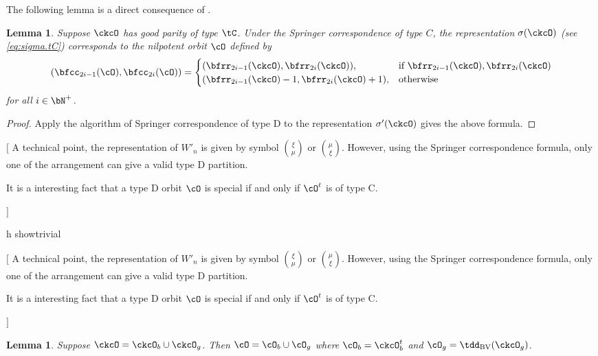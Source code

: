 \documentclass[12pt,a4paper]{amsart}
\newcommand{\trivial}[2][]{\if\relax\detokenize{#1}\relax
  {%
      \color{orange} \vspace{0em} $[$  #2 $]$
      \color{black}
  }
  \else
\ifx#1h
\ifcsname showtrivial\endcsname
{%
    \color{orange} \vspace{0em}  $[$ #2 $]$
    \color{black}
}
\fi
\else {\red Wrong argument!} \fi
\fi
}
\numberwithin{equation}{section}
\newtheorem{lem}[thm]{Lemma}
\theoremstyle{remark}
\begin{document}
The following lemma is a direct consequence of .
\begin{lem}
  Suppose $\ckcO$ has good parity of type $\tC$. Under the Springer
  correspondence of type $C$, the representation $\sigma(\ckcO)$ (see
  \eqref{eq:sigma.tC}) corresponds to the nilpotent orbit $\cO$ defined by
  \[
    (\bfcc_{2i-1}(\cO),\bfcc_{2i}(\cO)) =\begin{cases}
      (\bfrr_{2i-1}(\ckcO),\bfrr_{2i}(\ckcO)), & \text{if } \bfrr_{2i-1}(\ckcO),\bfrr_{2i}(\ckcO)\\
      (\bfrr_{2i-1}(\ckcO)-1,\bfrr_{2i}(\ckcO)+1), & \text{otherwise} \\
    \end{cases}
  \]
  for all $i\in \bN^+$.
\end{lem}
\begin{proof}
  Apply the algorithm of Springer correspondence of type D to the representation $\sigma'(\ckcO)$ gives the above formula.
\end{proof}
\trivial{
A technical point, the representation of $W'_n$ is given by symbol $\binom{\xi}{\mu}$ or
$\binom{\mu}{\xi}$. However, using the Springer correspondence formula, only one of the arrangement
can give a valid type D partition.

It is a interesting fact that a type D orbit $\cO$ is special if and only if $\cO^t$ is of type C.



}



\def\tdBV{\tdd_{\text{BV}}}
\begin{lem}
Suppose $\ckcO = \ckcO_{b}\cup \ckcO_{g}$.
Then $\cO = \cO_{b} \cup \cO_{g}$ where $\cO_{b} = \ckcO_{b}^{t}$ and
$\cO_{g}=\tdBV(\ckcO_{g})$.
\end{lem}

\end{document}
